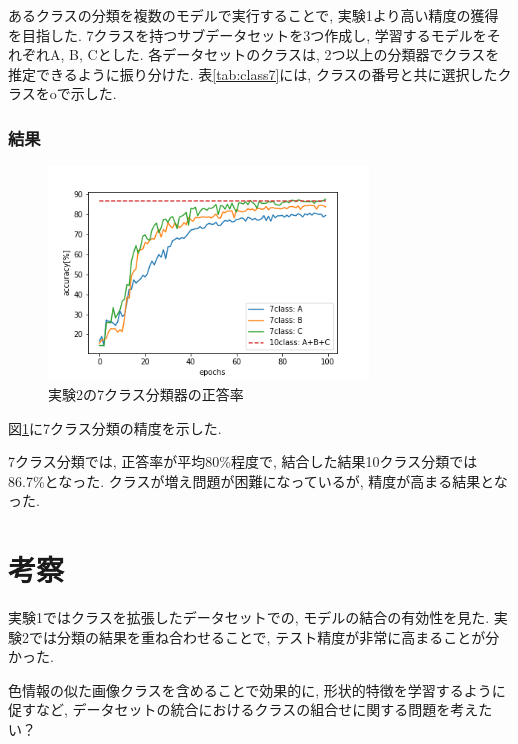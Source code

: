 \documentclass[twocolumn]{jarticle}     %
\begin{document}
あるクラスの分類を複数のモデルで実行することで, 実験1より高い精度の獲得を目指した.
7クラスを持つサブデータセットを3つ作成し, 学習するモデルをそれぞれA, B, Cとした.
各データセットのクラスは, 2つ以上の分類器でクラスを推定できるように振り分けた.
表\ref{tab:class7}には, クラスの番号と共に選択したクラスをoで示した.

\subsubsection{結果}

\begin{figure}[tb]
	\begin{center}
		\includegraphics[clip,width=8.5cm]{accuracy7.png}
		\caption{実験2の7クラス分類器の正答率}
		\label{fig:accuracy7}
	\end{center}
\end{figure}

図\ref{fig:accuracy7}に7クラス分類の精度を示した.

7クラス分類では, 正答率が平均80\%程度で, 結合した結果10クラス分類では86.7\%となった.
クラスが増え問題が困難になっているが, 精度が高まる結果となった.

\section{考察}


実験1ではクラスを拡張したデータセットでの, モデルの結合の有効性を見た.
実験2では分類の結果を重ね合わせることで, テスト精度が非常に高まることが分かった.

色情報の似た画像クラスを含めることで効果的に, 形状的特徴を学習するように促すなど, データセットの統合におけるクラスの組合せに関する問題を考えたい？
\end{document}
